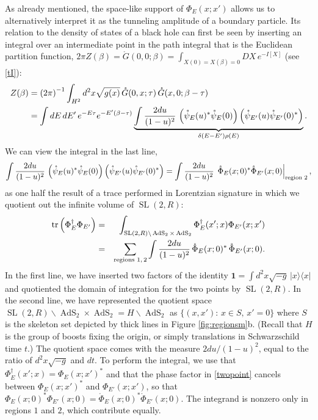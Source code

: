 \documentclass[11pt]{article}
\newcommand{\be}{\begin{equation}}
\newcommand{\ee}{\end{equation}}
\newcommand{\bea}{\begin{eqnarray}}
\newcommand{\eea}{\end{eqnarray}}
\newcommand{\nn}{\nonumber\\}
\newcommand{\lt}{\left}
\newcommand{\rt}{\right}
\newcommand*{\bra}[1]{\langle{#1}|}
\newcommand*{\ket}[1]{|{#1}\rangle}
\newcommand{\RR}{\mathbb{R}}
\DeclareMathOperator{\tr}{tr}
\DeclareMathOperator{\tSL}{\widetilde{\mathrm{SL}}}
\DeclareMathOperator{\tAdS}{\widetilde{AdS}}
\DeclareMathOperator{\HH}{H}
\newcommand{\unit}{\mathbf{1}}
\newcommand{\de}{\delta}
\newcommand{\ov}{\over}
\def\widetilde#1{#1}%
\def\HH{H}
\def\RR{R}
\begin{document}
As already mentioned, the space-like support of $\Phi_E(x; x')$ allows us to alternatively interpret it as the tunneling amplitude of a boundary particle. Its relation to the density of states of a black hole can first be seen by inserting an integral over an intermediate point in the path integral that is the Euclidean partition function, $2\pi Z(\beta)=\mathring{G}(0,0;\beta)=\int_{X(0)=X(\beta)=0} DX\, e^{-I[X]}$ (see \eqref{tI}):
\begin{equation}\label{Zlong}
\begin{aligned}
Z(\beta)&=\lt(2\pi\rt)^{-1}\int_{\HH^2} d^2x \sqrt{g(x)}\, \mathring{G}(0, x; \tau)\,\mathring{G}(x,0;\beta-\tau)\\
&=\int dE\, dE'\, e^{-E\tau}e^{-E'(\beta-\tau)}\underbrace{\int{2du \ov (1-u)^2}\, \lt(\mathring{\psi}_E(u)^* \mathring{\psi}_E(0)\rt) \lt(\mathring{\psi}_{E'}(u) \mathring{\psi}_{E'}(0)^*\rt)}_{\de(E-E')\rho(E)}.
\end{aligned}
\end{equation}
We can view the integral in the last line,
\be \label{trans}
\int{2du \ov (1-u)^2}\, \lt(\mathring{\psi}_E(u)^* \mathring{\psi}_E(0)\rt) \lt(\mathring{\psi}_{E'}(u) \mathring{\psi}_{E'}(0)^*\rt)=\int{2du \ov (1-u)^2}\, \left.\mathring{\Phi}_E(x;0)^* \mathring{\Phi}_{E'}(x;0) \right|_{\text{region $2$}},
\ee 
as one half the result of a trace performed in Lorentzian signature in which we quotient out the infinite volume of $\tSL(2,\RR)$:
\bea \label{trexp}
\tr\lt(\Phi_E^{\dagger}\Phi_{E'}\rt)&=&\int_{\tSL(2,\RR)\backslash \tAdS_2 \times \tAdS_2}\Phi^{\dagger}_E(x'; x)\Phi_{E'}(x; x')\nn
&=&\sum_{\text{regions $1,2$}}\int{2 du \ov (1-u)^2}\, \mathring{\Phi}_{E}(x;0)^*\, \mathring{\Phi}_{E'}(x;0).
\eea
In the first line, we have inserted two factors of the identity $\unit=\int d^2x \sqrt{-g}\,\ket{x}\bra{x}$ and quotiented the domain of integration for the two points by $\tSL(2,\RR)$. In the second line, we have represented the quotient space $\tSL(2,\RR)\backslash \tAdS_2 \times \tAdS_2=H\backslash \tAdS_2$ as $\{(x, x'):\, x\in S,\, x'=0\}$ where $S$ is the skeleton set depicted by thick lines in Figure \ref{fig:regionsm}b. (Recall that $H$ is the group of boosts fixing the origin, or simply translations in Schwarzschild time $t$.) The quotient space comes with the measure $2du/(1-u)^2$, equal to the ratio of $d^2x\sqrt{-g}$ and $dt$. To perform the integral, we use that $\Phi_E^{\dagger}(x'; x)=\Phi_E(x; x')^*$ and that the phase factor in \eqref{twopoint} cancels between $\Phi_E(x;x')^*$ and $\Phi_{E'}(x;x')$, so that $\Phi_{E}(x;0)^* \Phi_{E'}(x;0)=\mathring{\Phi}_E(x;0)^*\mathring{\Phi}_{E'}(x;0)$.
The integrand is nonzero only in regions $1$ and $2$, which contribute equally.
\end{document}
